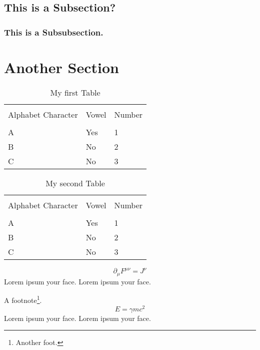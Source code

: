 \subsection{This is a Subsection?}

\lipsum[5-10]

\subsubsection{This is a Subsubsection.}

\lipsum

\section{Another Section}

\lipsum[2-4]

\begin{table}
\begin{center}
\begin{tabular}{lll}
\hline
\\[3pt]
Alphabet Character & Vowel & Number \\[3pt]
\hline
\\[3pt]
A & Yes & 1 \\
B & No & 2 \\
C & No & 3 \\[3pt]
\hline
\end{tabular}
\label{tbl1}
\caption{My first Table}
\end{center}
\end{table}

\lipsum[4-6]
\begin{table}
\begin{center}
\begin{tabular}{lll}
\hline
\\[3pt]
Alphabet Character & Vowel & Number \\[3pt]
\hline
\\[3pt]
A & Yes & 1 \\
B & No & 2 \\
C & No & 3 \\[3pt]
\hline
\end{tabular}
\label{tbl2}
\caption{My second Table}
\end{center}
\end{table}

\lipsum[1-12]
\begin{equation}
\partial_\mu F^{\mu\nu} = J^\nu
\end{equation}
Lorem ipsum your face. Lorem ipsum your face. 

\lipsum[1]A footnote\footnote{Another foot.}.\lipsum[2-5]
\begin{equation}
E = \gamma mc^2
\end{equation}
Lorem ipsum your face. Lorem ipsum your face. 

\lipsum[2-5]
